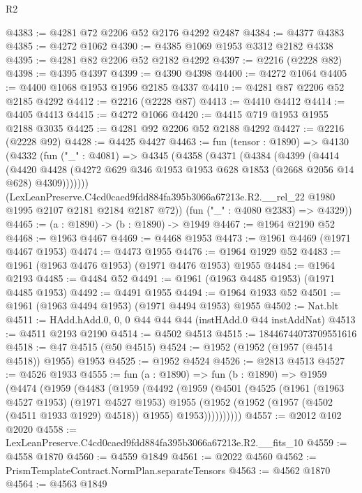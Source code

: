 \begin{lexlean}{R2}
\begin{coremodule}
@4383 := @4281 @72 @2206 @52 @2176 @4292 @2487
@4384 := @4377 @4383
@4385 := @4272 @1062
@4390 := @4385 @1069 @1953 @3312 @2182 @4338
@4395 := @4281 @82 @2206 @52 @2182 @4292
@4397 := @2216 (@2228 @82)
@4398 := @4395 @4397
@4399 := @4390 @4398
@4400 := @4272 @1064
@4405 := @4400 @1068 @1953 @1956 @2185 @4337
@4410 := @4281 @87 @2206 @52 @2185 @4292
@4412 := @2216 (@2228 @87)
@4413 := @4410 @4412
@4414 := @4405 @4413
@4415 := @4272 @1066
@4420 := @4415 @719 @1953 @1955 @2188 @3035
@4425 := @4281 @92 @2206 @52 @2188 @4292
@4427 := @2216 (@2228 @92)
@4428 := @4425 @4427
@4463 := fun (tensor : @1890) =>
  @4130
    (@4332
      (fun ("_" : @4081) =>
      @4345
        (@4358
          (@4371
            (@4384
              (@4399
                (@4414
                  (@4420
                    @4428
                    (@4272 @629 @346 @1953 @1953 @628 @1853 (@2668 @2056 @14 @628) @4309)))))))
        (LexLeanPreserve.C4cd0caed9fdd884fa395b3066a67213e.R2.__rel_22
          @1980
          @1995
          @2107
          @2181
          @2184
          @2187
          @72))
      (fun ("_" : @4080 @2383) => @4329))
@4465 := (a : @1890) -> (b : @1890) -> @1949
@4467 := @1964 @2190 @52
@4468 := @1963 @4467
@4469 := @4468 @1953
@4473 := @1961 @4469 (@1971 @4467 @1953)
@4474 := @4473 @1955
@4476 := @1964 @1929 @52
@4483 := @1961 (@1963 @4476 @1953) (@1971 @4476 @1953) @1955
@4484 := @1964 @2193
@4485 := @4484 @52
@4491 := @1961 (@1963 @4485 @1953) (@1971 @4485 @1953)
@4492 := @4491 @1955
@4494 := @1964 @1933 @52
@4501 := @1961 (@1963 @4494 @1953) (@1971 @4494 @1953) @1955
@4502 := Nat.blt
@4511 := HAdd.hAdd.{0, 0, 0} @44 @44 @44 (instHAdd.{0} @44 instAddNat)
@4513 := @4511 @2193 @2190
@4514 := @4502 @4513
@4515 := 18446744073709551616
@4518 := @47 @4515 (@50 @4515)
@4524 := @1952 (@1952 (@1957 (@4514 @4518)) @1955) @1953
@4525 := @1952 @4524
@4526 := @2813 @4513
@4527 := @4526 @1933
@4555 := fun (a : @1890) =>
  fun (b : @1890) =>
  @1959
    (@4474
      (@1959
        (@4483
          (@1959
            (@4492
              (@1959
                (@4501
                  (@4525
                    (@1961
                      (@1963 @4527 @1953)
                      (@1971 @4527 @1953)
                      @1955
                      (@1952 (@1952 (@1957 (@4502 (@4511 @1933 @1929) @4518)) @1955) @1953))))))))))
@4557 := @2012 @102 @2020
@4558 := LexLeanPreserve.C4cd0caed9fdd884fa395b3066a67213e.R2.__fits_10
@4559 := @4558 @1870
@4560 := @4559 @1849
@4561 := @2022 @4560
@4562 := PrismTemplateContract.NormPlan.separateTensors
@4563 := @4562 @1870
@4564 := @4563 @1849

\end{coremodule}
\end{lexlean}
